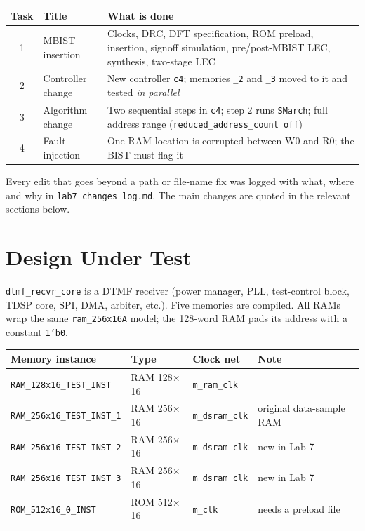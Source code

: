 \documentclass[11pt]{article}
\newcommand{\code}[1]{\texttt{\small #1}}
\begin{document}
\begin{center}
\small
\begin{tabular}{@{}cp{4.1cm}p{8.4cm}@{}}
\toprule
\textbf{Task} & \textbf{Title} & \textbf{What is done} \\ \midrule
1 & MBIST insertion & Clocks, DRC, DFT specification, ROM preload, insertion, signoff simulation, pre/post-MBIST LEC, synthesis, two-stage LEC \\
2 & Controller change & New controller \code{c4}; memories \code{\_2} and \code{\_3} moved to it and tested \emph{in parallel} \\
3 & Algorithm change & Two sequential steps in \code{c4}; step 2 runs \code{SMarch}; full address range (\code{reduced\_address\_count off}) \\
4 & Fault injection & One RAM location is corrupted between W0 and R0; the BIST must flag it \\ \bottomrule
\end{tabular}
\end{center}

\begin{whybox}
Every edit that goes beyond a path or file-name fix was logged with what, where and why in \code{lab7\_changes\_log.md}.
The main changes are quoted in the relevant sections below.
\end{whybox}

\section{Design Under Test}

\code{dtmf\_recvr\_core} is a DTMF receiver (power manager, PLL, test-control block, TDSP core, SPI, DMA, arbiter, etc.).
Five memories are compiled. All RAMs wrap the same \code{ram\_256x16A} model; the 128-word RAM pads its address
with a constant \code{1'b0}.

\begin{center}
\small
\begin{tabular}{@{}llll@{}}
\toprule
\textbf{Memory instance} & \textbf{Type} & \textbf{Clock net} & \textbf{Note} \\ \midrule
\code{RAM\_128x16\_TEST\_INST} & RAM 128$\times$16 & \code{m\_ram\_clk} & \\
\code{RAM\_256x16\_TEST\_INST\_1} & RAM 256$\times$16 & \code{m\_dsram\_clk} & original data-sample RAM \\
\code{RAM\_256x16\_TEST\_INST\_2} & RAM 256$\times$16 & \code{m\_dsram\_clk} & new in Lab 7 \\
\code{RAM\_256x16\_TEST\_INST\_3} & RAM 256$\times$16 & \code{m\_dsram\_clk} & new in Lab 7 \\
\code{ROM\_512x16\_0\_INST} & ROM 512$\times$16 & \code{m\_clk} & needs a preload file \\ \bottomrule
\end{tabular}
\end{center}
\end{document}
